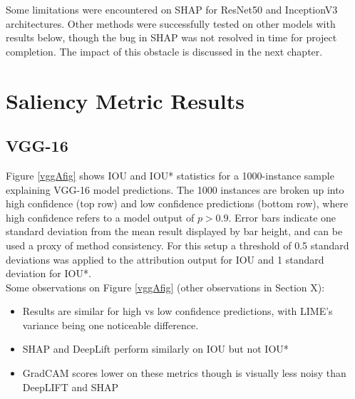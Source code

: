 \documentclass[main]{subfiles}
\begin{document}
Some limitations were encountered on SHAP for ResNet50 and InceptionV3 architectures. Other methods were successfully tested on other models with results below, though the bug in SHAP was not resolved in time for project completion. The impact of this obstacle is discussed in the next chapter.

\section{Saliency Metric Results}
\subsection{VGG-16}

Figure \ref{vggAfig} shows IOU and IOU* statistics for a 1000-instance sample explaining VGG-16 model predictions. The 1000 instances are broken up into high confidence (top row) and low confidence predictions (bottom row), where high confidence refers to a model output of $p>0.9$. Error bars indicate one standard deviation from the mean result displayed by bar height, and can be used a proxy of method consistency. For this setup a threshold of 0.5 standard deviations was applied to the attribution output for IOU and 1 standard deviation for IOU*.\\

\vspace{0.2in}
Some observations on Figure \ref{vggAfig} (other observations in Section X):
\begin{itemize}
\item Results are similar for high vs low confidence predictions, with LIME's variance being one noticeable difference.
\item SHAP and DeepLift perform similarly on IOU but not IOU*
\item GradCAM scores lower on these metrics though is visually less noisy than DeepLIFT and SHAP
\end{itemize}


\newpage

\end{document}
